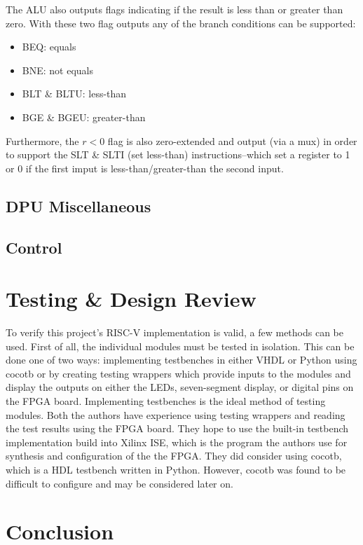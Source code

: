 \documentclass[lettersize,journal]{IEEEtran}
\begin{document}
\begin{itemize}
The ALU also outputs flags indicating if the result is less than or greater than zero.
With these two flag outputs any of the branch conditions can be supported:
\begin{itemize}
    \item BEQ: equals
    \item BNE: not equals
    \item BLT \& BLTU: less-than
    \item BGE \& BGEU: greater-than
\end{itemize}
Furthermore, the $r<0$ flag is also zero-extended and output (via a mux) in order to support the SLT \& SLTI (set less-than) instructions--which set a register to 1
or 0 if the first imput is less-than/greater-than the second input.

\subsection{DPU Miscellaneous}
\color{red}{TBD}\color{black}

\subsection{Control}
\color{red}{TBD}\color{black}

\section{Testing \& Design Review}
To verify this project's RISC-V implementation is valid, a few methods can be used. First of all, the individual modules must be tested in isolation.
This can be done one of two ways: implementing testbenches in either VHDL or Python using cocotb or by creating testing wrappers which provide inputs to the modules and display the outputs on either the LEDs, seven-segment display, or digital pins on the FPGA board.
Implementing testbenches is the ideal method of testing modules.
Both the authors have experience using testing wrappers and reading the test results using the FPGA board.
They hope to use the built-in testbench implementation build into Xilinx ISE, which is the program the authors use for synthesis and configuration of the the FPGA.
They did consider using cocotb, which is a HDL testbench written in Python.
However, cocotb was found to be difficult to configure and may be considered later on.

\section{Conclusion}
\color{red}{TBD}\color{black}


\end{itemize}
\end{document}
